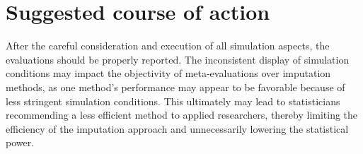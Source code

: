 \documentclass[bimj,fleqn]{w-art}
\begin{document}



% 





\section{Suggested course of action}

After the careful consideration and execution of all simulation aspects, the evaluations should be properly reported. The inconsistent display of simulation conditions may impact the objectivity of meta-evaluations over imputation methods, as one method's performance may appear to be favorable because of less stringent simulation conditions. This ultimately may lead to statisticians recommending a less efficient method to applied researchers, thereby limiting the efficiency of the imputation approach and unnecessarily lowering the statistical power.
\end{document}
